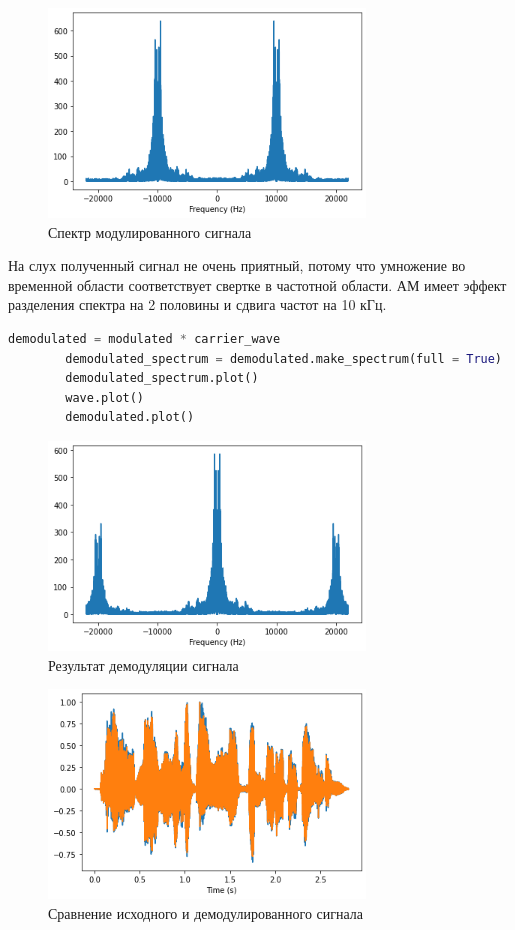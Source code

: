 \documentclass[a4paper, 12pt]{report}
\begin{document}
	\begin{figure}[H]
		\centering
		\includegraphics[width=0.75\textwidth]{am3.png}
		\caption{Спектр модулированного сигнала}
		\label{fig:am3}
	\end{figure}
	На слух полученный сигнал не очень приятный, потому что умножение во временной области соответствует свертке в частотной области. АМ имеет эффект разделения спектра на 2 половины и сдвига частот на 10 кГц.
	\begin{lstlisting}[language=Python,caption=Демодуляция сигнала]
		demodulated = modulated * carrier_wave
		demodulated_spectrum = demodulated.make_spectrum(full = True)
		demodulated_spectrum.plot()
		wave.plot()
		demodulated.plot()
	\end{lstlisting}
	\begin{figure}[H]
		\centering
		\includegraphics[width=0.75\textwidth]{am4.png}
		\caption{Результат демодуляции сигнала}
		\label{fig:am4}
	\end{figure}
	\begin{figure}[H]
		\centering
		\includegraphics[width=0.75\textwidth]{am5.png}
		\caption{Сравнение исходного и демодулированного сигнала}
		\label{fig:am5}
	\end{figure}
\end{document}

